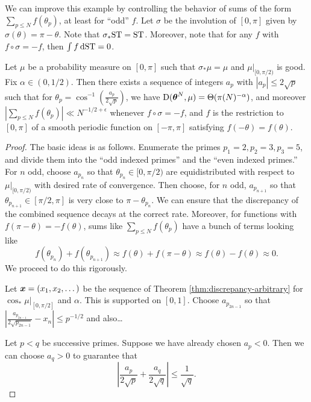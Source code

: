 We can improve this example by controlling the behavior of sums of the form 
$\sum_{p\leqslant N} f(\theta_p)$, at least for ``odd'' $f$. Let $\sigma$ be 
the involution of $[0,\pi]$ given by $\sigma(\theta) = \pi-\theta$. Note that 
$\sigma_\ast \mathrm{ST} = \mathrm{ST}$. Moreover, note that for any $f$ with 
$f\circ \sigma = -f$, then $\int f\, \mathrm{d}\mathrm{ST} = 0$. 

\begin{theorem}
Let $\mu$ be a probability measure on $[0,\pi]$ such that 
$\sigma_\ast\mu = \mu$ and $\left.\mu\right|_{[0,\pi/2)}$ is good. Fix 
$\alpha\in (0,1/2)$. Then there exists a sequence of integers $a_p$ with 
$|a_p|\leqslant 2\sqrt p$ such that for 
$\theta_p =\cos^{-1}\left( \frac{a_p}{2\sqrt p}\right)$, we have 
$\operatorname{D}({\boldsymbol\theta}^N,\mu) = \Theta(\pi(N)^{-\alpha})$, and moreover 
$\left| \sum_{p\leqslant N} f(\theta_p)\right| \ll N^{-1/2+\epsilon}$ 
whenever $f\circ \sigma = - f$, and $f$ is the restriction to $[0,\pi]$ of a 
smooth periodic function on $[-\pi,\pi]$ satisfying $f(-\theta) = f(\theta)$. 
\end{theorem}
\begin{proof}
The basic ideas is as follows. Enumerate the primes 
$p_1 =2, p_2 = 3, p_3 = 5$, and divide them into the ``odd indexed primes'' and 
the ``even indexed primes.'' For $n$ odd, choose $a_{p_n}$ so that 
$\theta_{p_n}\in [0,\pi/2)$ are equidistributed with respect to 
$\left.\mu\right|_{[0,\pi/2)}$ with desired rate of convergence. Then choose, 
for $n$ odd, $a_{p_{n+1}}$ so that $\theta_{p_{n+1}}\in [\pi/2,\pi]$ is very 
close to $\pi-\theta_{p_n}$. We can ensure that the discrepancy of the 
combined sequence decays at the correct rate. Moreover, for functions with  
$f(\pi-\theta) = -f(\theta)$, sums like $\sum_{p\leqslant N} f(\theta_p)$ 
have a bunch of terms looking like 
\[
	f(\theta_{p_n}) + f(\theta_{p_{n+1}})\approx f(\theta) + f(\pi-\theta) \approx f(\theta) - f(\theta) \approx 0 .
\]
We proceed to do this rigorously. 

Let ${\boldsymbol x}=(x_1,x_2,\dots)$ be the sequence of Theorem 
\ref{thm:discrepancy-arbitrary} for $\cos_\ast \left. \mu\right|_{[0,\pi/2]}$ 
and $\alpha$. This is supported on $[0,1]$. Choose $a_{p_{2n-1}}$ so that 
$\left| \frac{a_{p_{2n-1}}}{2\sqrt{p_{2n-1}}} - x_n\right| \leqslant p^{-1/2}$ 
and also\ldots

Let $p<q$ be successive primes. Suppose we have already chosen $a_p<0$. Then 
we can choose $a_q>0$ to guarantee that 
\[
	\left| \frac{a_p}{2\sqrt p} + \frac{a_q}{2\sqrt q}\right| \leqslant \frac{1}{\sqrt q} .
\]

\end{proof}





